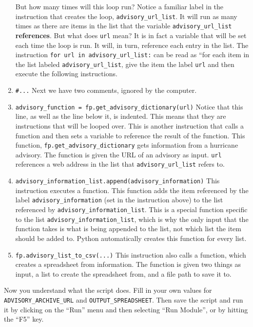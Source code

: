 \documentclass{article}
\begin{document}
\begin{enumerate}
        But how many times will this loop run?  Notice a familiar label in the instruction that creates the loop, \verb+advisory_url_list+.  It will run as many times as there are items in the list that the variable \verb+advisory_url_list+ \textbf{references}.  But what does \verb+url+ mean?  It is in fact a variable that will be set each time the loop is run.  It will, in turn, reference each entry in the list.  The instruction \verb+for url in advisory_url_list:+ can be read as ``for each item in the list labeled \verb+advisory_url_list+, give the item the label \verb+url+ and then execute the following instructions.
    \item \verb+#...+ Next we have two comments, ignored by the computer.
    \item \verb+advisory_function = fp.get_advisory_dictionary(url)+ Notice that this line, as well as the line below it, is indented.  This means that they are instructions that will be looped over.  This is another instruction that calls a function and then sets a variable to reference the result of the function.  This function, \verb+fp.get_advisory_dictionary+ gets information from a hurricane advisory.  The function is given the URL of an advisory as input.  \verb+url+ references a web address in the list that  \verb+advisory_url_list+ refers to.  
    \item \verb+advisory_information_list.append(advisory_information)+ This instruction executes a function.  This function adds the item referenced by the label \verb+advisory_information+ (set in the instruction above) to the list referenced by \verb+advisory_information_list+.  This is a special function specific to the list \verb+advisory_information_list+, which is why the only input that the function takes is what is being appended to the list, not which list the item should be added to.  Python automatically creates this function for every list.
    \item \verb+fp.advisory_list_to_csv(...)+ This instruction also calls a function, which creates a spreadsheet from information.  The function is given two things as input, a list to create the spreadsheet from, and a file path to save it to.
\end{enumerate}

Now you understand what the script does.  Fill in your own values for \verb+ADVISORY_ARCHIVE_URL+ and \verb+OUTPUT_SPREADSHEET+.  Then save the script and run it by clicking on the ``Run'' menu and then selecting ``Run Module'', or by hitting the ``F5'' key.
\end{document}
